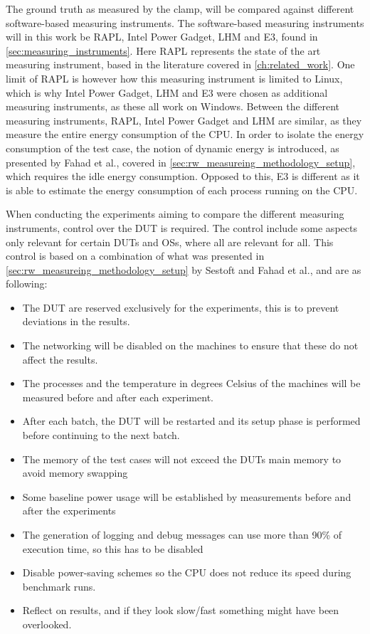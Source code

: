 The ground truth as measured by the clamp, will be compared against different software-based measuring instruments. The software-based measuring instruments will in this work be RAPL, Intel Power Gadget, LHM and E3, found in \cref{sec:measuring_instruments}. Here RAPL represents the state of the art measuring instrument, based in the literature covered in \cref{ch:related_work}. One limit of RAPL is however how this measuring instrument is limited to Linux, which is why Intel Power Gadget, LHM and E3 were chosen as additional measuring instruments, as these all work on Windows. Between the different measuring instruments, RAPL, Intel Power Gadget and LHM are similar, as they measure the entire energy consumption of the CPU. In order to isolate the energy consumption of the test case, the notion of dynamic energy is introduced, as presented by Fahad et al.\cite{fahad2019comparative}, covered in \cref{sec:rw_measureing_methodology_setup}, which requires the idle energy consumption. Opposed to this, E3 is different as it is able to estimate the energy consumption of each process running on the CPU.\newline

When conducting the experiments aiming to compare the different measuring instruments, control over the DUT is required. The control include some aspects only relevant for certain DUTs and OSs, where all are relevant for all. This control is based on a combination of what was presented in \cref{sec:rw_measureing_methodology_setup} by Sestoft\cite[]{sestoft2013microbenchmarks} and Fahad et al.\cite[]{fahad2019comparative}, and are as following:

\begin{itemize}
    \item The DUT are reserved exclusively for the experiments, this is to prevent deviations in the results.
    \item The networking will be disabled on the machines to ensure that these do not affect the results.
    \item The processes and the temperature in degrees Celsius of the machines will be measured before and after each experiment.
    \item After each batch, the DUT will be restarted and its setup phase is performed before continuing to the next batch.
    \item The memory of the test cases will not exceed the DUTs main memory to avoid memory swapping
    \item Some baseline power usage will be established by measurements before and after the experiments
    \item The generation of logging and debug messages can use more than 90\% of execution time, so this has to be disabled
    \item Disable power-saving schemes so the CPU does not reduce its speed during benchmark runs.
    \item Reflect on results, and if they look slow/fast something might have been overlooked.
\end{itemize}


